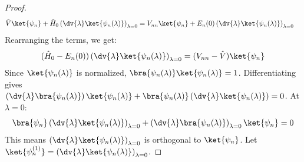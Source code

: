 \begin{proof}
    \begin{align} \label{eq:schrodinger_deriv_at_zero}
        \hat V \ket{\psi_n} + \hat H_0
        \left(\dv{\lambda}\ket{\psi_n(\lambda)}\right)_{\lambda=0} &=
        V_{nn} \ket{\psi_n} + E_n(0)
        \left(\dv{\lambda}\ket{\psi_n(\lambda)}\right)_{\lambda=0}
    \end{align}
    Rearranging the terms, we get:
    \begin{equation} \label{eq:psi_deriv_equation}
        (\hat H_0 - E_n(0))
        \left(\dv{\lambda}\ket{\psi_n(\lambda)}\right)_{\lambda=0} =
        (V_{nn} - \hat V) \ket{\psi_n}
    \end{equation}
    Since $\ket{\psi_n(\lambda)}$ is normalized,
    $\bra{\psi_n(\lambda)}\ket{\psi_n(\lambda)} = 1$. Differentiating
    gives
    $\left(\dv{\lambda}\bra{\psi_n(\lambda)}\right)\ket{\psi_n(\lambda)}
    +
    \bra{\psi_n(\lambda)}\left(\dv{\lambda}\ket{\psi_n(\lambda)}\right)
    = 0$. At $\lambda=0$:
    \begin{equation} \label{eq:psi_deriv_orthogonality}
        \bra{\psi_n}
        \left(\dv{\lambda}\ket{\psi_n(\lambda)}\right)_{\lambda=0} +
        \left(\dv{\lambda}\bra{\psi_n(\lambda)}\right)_{\lambda=0}
        \ket{\psi_n} = 0
    \end{equation}
    This means
    $\left(\dv{\lambda}\ket{\psi_n(\lambda)}\right)_{\lambda=0}$ is
    orthogonal to $\ket{\psi_n}$. Let $\ket{\psi_n^{(1)}} =
    \left(\dv{\lambda}\ket{\psi_n(\lambda)}\right)_{\lambda=0}$.


\end{proof}
